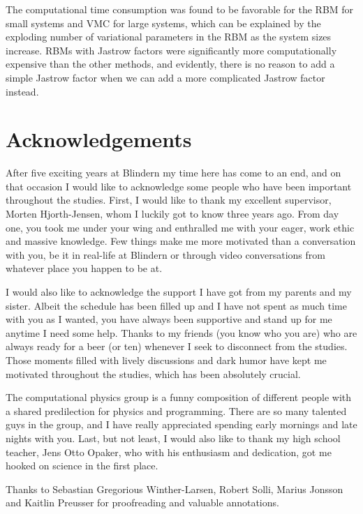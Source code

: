The computational time consumption was found to be favorable for the RBM for small systems and VMC for large systems, which can be explained by the exploding number of variational parameters in the RBM as the system sizes increase. RBMs with Jastrow factors were significantly more computationally expensive than the other methods, and evidently, there is no reason to add a simple Jastrow factor when we can add a more complicated Jastrow factor instead.

\thispagestyle{empty}
\cleardoublepage

\section*{Acknowledgements}
After five exciting years at Blindern my time here has come to an end, and on that occasion I would like to acknowledge some people who have been important throughout the studies. First, I would like to thank my excellent supervisor, Morten Hjorth-Jensen, whom I luckily got to know three years ago. From day one, you took me under your wing and enthralled me with your eager, work ethic and massive knowledge. Few things make me more motivated than a conversation with you, be it in real-life at Blindern or through video conversations from whatever place you happen to be at.

I would also like to acknowledge the support I have got from my parents and my sister. Albeit the schedule has been filled up and I have not spent as much time with you as I wanted, you have always been supportive and stand up for me anytime I need some help. Thanks to my friends (you know who you are) who are always ready for a beer (or ten) whenever I seek to disconnect from the studies. Those moments filled with lively discussions and dark humor have kept me motivated throughout the studies, which has been absolutely crucial.

The computational physics group is a funny composition of different people with a shared predilection for physics and programming. There are so many talented guys in the group, and I have really appreciated spending early mornings and late nights with you. Last, but not least, I would also like to thank my high school teacher, Jens Otto Opaker, who with his enthusiasm and dedication, got me hooked on science in the first place.

Thanks to Sebastian Gregorious Winther-Larsen, Robert Solli, Marius Jonsson and Kaitlin Preusser for proofreading and valuable annotations.

